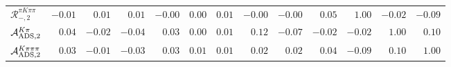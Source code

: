 \begin{table}
\begin{tabular}{l|rrrrrrrrrrrr}
$\mathcal{R}_{-,2}^{\pi K\pi\pi}$ & $-0.01$ & $0.01$ & $0.01$ & $-0.00$ & $0.00$ & $0.01$ & $-0.00$ & $-0.00$ & $0.05$ & $1.00$ & $-0.02$ & $-0.09$ \\

$\mathcal{A}_{\rm ADS,2}^{K\pi}$ & $0.04$ & $-0.02$ & $-0.04$ & $0.03$ & $0.00$ & $0.01$ & $0.12$ & $-0.07$ & $-0.02$ & $-0.02$ & $1.00$ & $0.10$ \\

$\mathcal{A}_{\rm ADS,2}^{K\pi\pi\pi}$ & $0.03$ & $-0.01$ & $-0.03$ & $0.03$ & $0.01$ & $0.01$ & $0.02$ & $0.02$ & $0.04$ & $-0.09$ & $0.10$ & $1.00$ \\
\end{tabular}
\label{tab:correlation_2v2}
\end{table}

